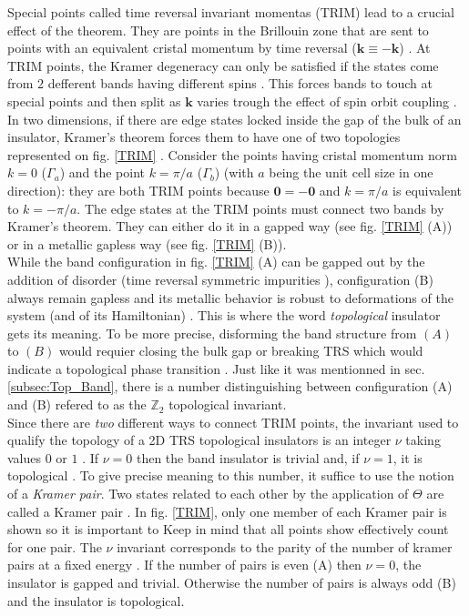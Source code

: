 Special points called time reversal invariant momentas (TRIM) lead to a crucial effect of the theorem. They are points in the Brillouin zone that are sent to points with an equivalent cristal momentum by time reversal ($\mathbf{k} \equiv -\mathbf{k}$) \cite{kruthoff_topology_2019}. At TRIM points, the Kramer degeneracy can only be satisfied if the states come from $2$ defferent bands having different spins \cite{kruthoff_topology_2019}. This forces bands to touch at special points and then split as $\mathbf{k}$ varies trough the effect of spin orbit coupling \cite{kane_topological_2013}. In two dimensions, if there are edge states locked inside the gap of the bulk of an insulator, Kramer's theorem forces them to have one of two topologies represented on fig. \ref{TRIM} \cite{kane_topological_2013}. Consider the points having cristal momentum norm $k = 0$ ($\Gamma_a$) and the point $k = \pi/a$ ($\Gamma_b$) (with $a$ being the unit cell size in one direction): they are both TRIM points because $\mathbf{0} = - \mathbf{0}$ and $k = \pi/a$ is equivalent to $k = -\pi/a$. The edge states at the TRIM points must connect two bands by Kramer's theorem. They can either do it in a gapped way (see fig. \ref{TRIM} (A)) or in a metallic gapless way (see fig. \ref{TRIM} (B)).\\

While the band configuration in fig. \ref{TRIM} (A) can be gapped out by the addition of disorder (time reversal symmetric impurities \cite{asboth_short_2016}), configuration (B) always remain gapless and its metallic behavior is robust to deformations of the system (and of its Hamiltonian) \cite{cayssol_topological_2021}. This is where the word \textit{topological} insulator gets its meaning. To be more precise, disforming the band structure from $(A)$ to $(B)$ would requier closing the bulk gap or breaking TRS which would indicate a topological phase transition \cite{cayssol_topological_2021}. Just like it was mentionned in sec. \ref{subsec:Top_Band}, there is a number distinguishing between configuration (A) and (B) refered to as the $\mathbb{Z}_2$ topological invariant.\\

Since there are \textit{two} different ways to connect TRIM points, the invariant used to qualify the topology of a 2D TRS topological insulators is an integer $\nu$ taking values $0$ or $1$ \cite{bernevig_topological_2013}. If $\nu = 0$ then the band insulator is trivial and, if $\nu = 1$, it is topological \cite{cayssol_topological_2021}. To give precise meaning to this number, it suffice to use the notion of a \textit{Kramer pair}. Two states related to each other by the application of $\Theta$ are called a Kramer pair \cite{asboth_short_2016}. In fig. \ref{TRIM}, only one member of each Kramer pair is shown so it is important to Keep in mind that all points show effectively count for one pair. The $\nu$ invariant corresponds to the parity of the number of kramer pairs at a fixed energy \cite{asboth_short_2016}. If the number of pairs is even (A) then $\nu = 0$, the insulator is gapped and trivial. Otherwise the number of pairs is always odd (B) and the insulator is topological.


